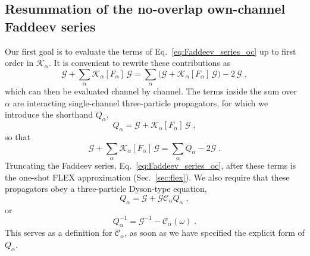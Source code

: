 \documentclass[aip,jcp,reprint,noshowkeys,superscriptaddress]{revtex4-1}
\newcommand{\cK}{\mathcal{K}}
\begin{document}
\subsection{Resummation of the no-overlap own-channel Faddeev series}
\label{sec:depth1}
Our first goal is to evaluate the terms 
of Eq.~\eqref{eq:Faddeev_series_oc} up to first order in 
$\cK_\alpha$. 
It is convenient to rewrite these contributions as
\begin{equation}
	\label{eq:one_pair_split}
\mathcal G+\sum_\alpha\cK_\alpha[F_\alpha]\,\mathcal G
=
\sum_\alpha\Big(\mathcal G+\cK_\alpha[F_\alpha]\,\mathcal G\Big)
-2\,\mathcal G \;,
\end{equation}
which can then be evaluated channel by channel. The terms 
inside the sum over $\alpha$ are interacting single-channel
three-particle propagators, for which we introduce the shorthand 
$Q_{\alpha}$, 
\begin{equation}
	\label{eq:Q_alpha}
	Q_\alpha = \mathcal G+\cK_\alpha[F_\alpha]\,\mathcal G \;,
\end{equation} 
so that 
\begin{equation}
	\mathcal G+\sum_\alpha\cK_\alpha[F_\alpha]\,\mathcal G = 
	\sum_{\alpha} Q_{\alpha} - 2 \mathcal G \;.
	\label{eq:R_FLEX_def}
\end{equation}
Truncating the Faddeev series, Eq.~\eqref{eq:Faddeev_series_oc}, after
these terms is the one-shot FLEX approximation\cite{Bickers1989,Bickers2004}
(Sec.~\ref{sec:flex}).
We also require that these propagators obey a three-particle 
Dyson-type equation, 
\begin{equation}
	Q_\alpha = \mathcal{G} +\mathcal{G} \mathcal C_{\alpha} Q_\alpha \;,
\end{equation}
or
\begin{equation}
	\label{eq:dyson_q}
Q_\alpha^{-1}
=
\mathcal G^{-1}-\mathcal C_\alpha(\omega) \;.
\nonumber
\end{equation}
This serves as a definition for $\mathcal C_\alpha$, as soon 
as we have specified the explicit form of $Q_\alpha$. 
\end{document}
